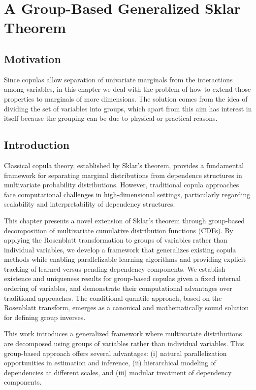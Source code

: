 \startcontents[chapter]
\chapter{A Group-Based Generalized Sklar Theorem}\label{ch:gensclak}
\minitocboxed

\section*{Motivation}
Since copulas allow separation of univariate marginals from the interactions among variables, in this chapter we deal with the problem of how to extend those properties to marginals of more dimensions. The solution comes from the idea of dividing the set of variables into groups, which apart from this aim has interest in itself because the grouping can be due to physical or practical reasons.

\section{Introduction}
Classical copula theory, established by Sklar's theorem, provides a fundamental framework for separating marginal distributions from dependence structures in multivariate probability distributions. However, traditional copula approaches face computational challenges in high-dimensional settings, particularly regarding scalability and interpretability of dependency structures.

This chapter presents a novel extension of Sklar's theorem through group-based decomposition of multivariate cumulative distribution functions (CDFs). By applying the Rosenblatt transformation to groups of variables rather than individual variables, we develop a framework that generalizes existing copula methods while enabling parallelizable learning algorithms and providing explicit tracking of learned versus pending dependency components. We establish existence and uniqueness results for group-based copulas given a fixed internal ordering of variables, and demonstrate their computational advantages over traditional approaches. The conditional quantile approach, based on the Rosenblatt transform, emerges as a canonical and mathematically sound solution for defining group inverses.

This work introduces a generalized framework where multivariate distributions are decomposed using groups of variables rather than individual variables. This group-based approach offers several advantages: (i) natural parallelization opportunities in estimation and inference, (ii) hierarchical modeling of dependencies at different scales, and (iii) modular treatment of dependency components.

